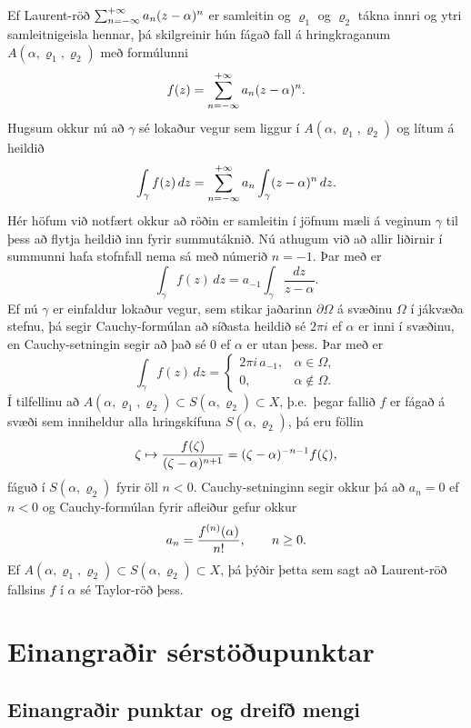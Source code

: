 Ef Laurent-röð $\sum_{n=-\infty}\sp{+\infty}a_n(z-\alpha)\sp n$ 
er samleitin og $\varrho_1$ og $\varrho_2$ tákna
innri og ytri samleitnigeisla hennar, þá skilgreinir hún fágað fall 
á hringkraganum
$A(\alpha,\varrho_1,\varrho_2)$ með formúlunni
 $$f(z)=\sum_{n=-\infty}\sp{+\infty}a_n(z-\alpha)\sp n.
 $$
Hugsum okkur nú að $\gamma$ sé lokaður vegur sem liggur í
$A(\alpha,\varrho_1,\varrho_2)$  og lítum á heildið
 \begin{equation*}\int_{\gamma} f(z)\, dz=
\sum_{n=-\infty}\sp{+\infty} a_n
\int_{\gamma} (z-\alpha)\sp n\, dz.
\label{10.5.3}
 \end{equation*}
Hér höfum við notfært okkur að röðin er samleitin í jöfnum mæli á
veginum $\gamma$ til þess að flytja heildið inn fyrir summutáknið. Nú
athugum við að allir liðirnir í summunni hafa stofnfall nema sá með
númerið $n=-1$.  Þar með er
 $$\int_{\gamma} f(z)\, dz=
a_{-1}
\int_{\gamma} \dfrac {dz}{z-\alpha}.
 $$
Ef nú $\gamma$ er einfaldur lokaður vegur, sem stikar jaðarinn
$\partial\Omega$ á svæðinu $\Omega$ í jákvæða stefnu, þá segir
Cauchy-formúlan að síðasta heildið sé $2\pi i$ ef $\alpha$ er inni í
svæðinu, en Cauchy-setningin segir að það sé $0$ ef $\alpha$ er utan
þess.  Þar með er
 \begin{equation*}\int_\gamma f(z) \, dz =\begin{cases}
2\pi i\, a_{-1}, &\alpha\in \Omega,\\
0, & \alpha\not\in \Omega.\end{cases}
\label{10.5.4}
 \end{equation*}
Í tilfellinu að $A(\alpha,\varrho_1,\varrho_2)\subset
S(\alpha,\varrho_2)\subset X$, þ.e.~þegar fallið 
$f$ er fágað á svæði sem inniheldur alla hringskífuna
$S(\alpha,\varrho_2)$, þá eru föllin
 $$\zeta\mapsto \dfrac
{f(\zeta)}{(\zeta-\alpha)\sp{n+1}}=(\zeta-\alpha)\sp{-n-1}f({\zeta}), 
 $$
fáguð í $S(\alpha,\varrho_2)$ fyrir öll $n<0$.  Cauchy-setninginn
segir okkur þá að $a_n=0$ ef $n<0$ og Cauchy-formúlan fyrir afleiður
gefur okkur
 $$a_n=\dfrac{f\sp{(n)}(\alpha)}{n!}, \qquad n\geq 0.
 $$
Ef $A(\alpha,\varrho_1,\varrho_2)\subset S(\alpha,\varrho_2)\subset X$,
þá  þýðir þetta sem sagt að Laurent-röð fallsins $f$ í ${\alpha}$ 
sé  Taylor-röð þess. 


\section{Einangraðir sérstöðupunktar}

\subsection*{Einangraðir punktar og dreifð mengi}

